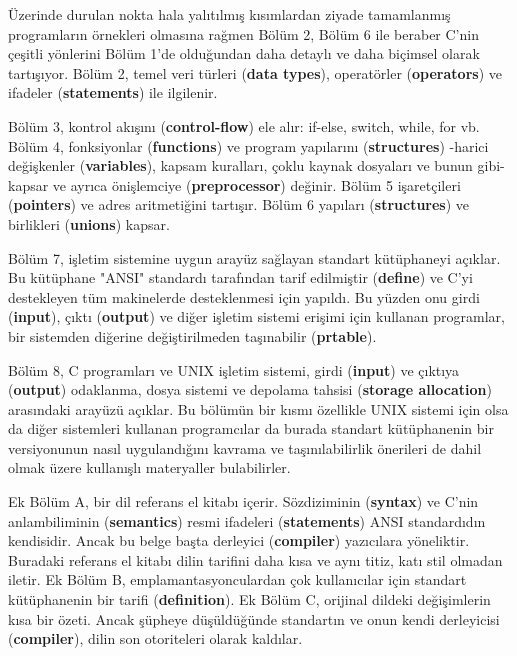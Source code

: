 \documentclass[a4paper,12pt,oneside]{book}
\begin{document}
\par Üzerinde durulan nokta hala yalıtılmış kısımlardan ziyade tamamlanmış programların örnekleri olmasına rağmen Bölüm 2, Bölüm 6 ile beraber C'nin çeşitli yönlerini Bölüm 1'de olduğundan daha detaylı ve daha biçimsel olarak tartışıyor. Bölüm 2, temel veri türleri (\textbf{data types}), operatörler (\textbf{operators}) ve ifadeler (\textbf{statements}) ile ilgilenir. \pagebreak

\noindent \thispagestyle{introduction} Bölüm 3, kontrol akışını (\textbf{control-flow}) ele alır: if-else, switch, while, for vb. Bölüm 4, fonksiyonlar (\textbf{functions}) ve program yapılarını (\textbf{structures}) -harici değişkenler (\textbf{variables}), kapsam kuralları, çoklu kaynak dosyaları ve bunun gibi- kapsar ve ayrıca önişlemciye (\textbf{preprocessor}) değinir. Bölüm 5 işaretçileri (\textbf{pointers}) ve adres aritmetiğini tartışır. Bölüm 6 yapıları (\textbf{structures}) ve birlikleri (\textbf{unions}) kapsar.
\par Bölüm 7, işletim sistemine uygun arayüz sağlayan standart kütüphaneyi açıklar. Bu kütüphane "ANSI" standardı tarafından tarif edilmiştir (\textbf{define}) ve C'yi destekleyen tüm makinelerde desteklenmesi için yapıldı. Bu yüzden onu girdi (\textbf{input}), çıktı (\textbf{output}) ve diğer işletim sistemi erişimi için kullanan programlar, bir sistemden diğerine değiştirilmeden taşınabilir (\textbf{prtable}).
\par Bölüm 8, C programları ve UNIX işletim sistemi, girdi (\textbf{input}) ve çıktıya (\textbf{output}) odaklanma, dosya sistemi ve depolama tahsisi (\textbf{storage allocation}) arasındaki arayüzü açıklar. Bu bölümün bir kısmı özellikle UNIX sistemi için olsa da diğer sistemleri kullanan programcılar da burada standart kütüphanenin bir versiyonunun nasıl uygulandığını kavrama ve taşınılabilirlik önerileri de dahil olmak üzere kullanışlı materyaller bulabilirler.
\par Ek Bölüm A, bir dil referans el kitabı içerir. Sözdiziminin (\textbf{syntax}) ve C'nin anlambiliminin (\textbf{semantics}) resmi ifadeleri (\textbf{statements}) ANSI standardıdın kendisidir. Ancak bu belge başta derleyici (\textbf{compiler}) yazıcılara yöneliktir. Buradaki referans el kitabı dilin tarifini daha kısa ve aynı titiz, katı stil olmadan iletir. Ek Bölüm B, emplamantasyonculardan çok kullanıcılar için standart kütüphanenin bir tarifi (\textbf{definition}). Ek Bölüm C, orijinal dildeki değişimlerin kısa bir özeti. Ancak şüpheye düşüldüğünde standartın ve onun kendi derleyicisi (\textbf{compiler}), dilin son otoriteleri olarak kaldılar.
\end{document}
